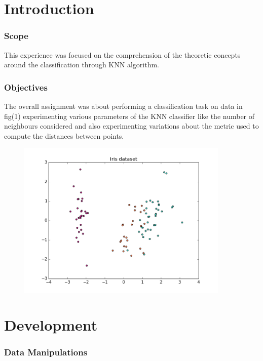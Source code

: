 \documentclass{article}
\begin{document}
			\renewcommand{\lstlistingname}{Code}

			
			\part{Introduction}
			
				\section{Scope}
This experience was focused on the comprehension of the theoretic concepts around the classification through KNN algorithm.  
				\section{Objectives}
				The overall assignment was about performing  a classification task on data in fig(1) experimenting various parameters of the KNN classifier like the number of neighbours considered and also experimenting variations about the metric used to compute the distances between points.
				
				\begin{center}
\begin{figure}
\centering
\includegraphics[width=0.9\textwidth]{figure_1}
\caption{}
\label{fig:1}
\end{figure}
\end{center}

\newpage
			\part{Development}
				\section{Data Manipulations}
	
\end{document}
